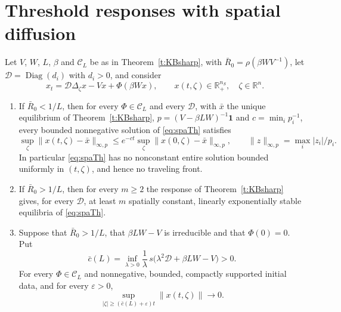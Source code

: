 \section{Threshold responses with spatial diffusion}\label{s:spaTh}
Let $V$, $W$, $L$, $\beta$ and $\mathcal C_L$ be as in Theorem~\ref{t:KBsharp}, with $\bar R_0=\rho(\beta WV^{-1})$, let $\mathcal D=\operatorname{Diag}(d_i)$ with $d_i>0$, and consider
\begin{equation}\label{eq:spaTh}
 x_t=\mathcal D\Delta_\zeta x-Vx+\Phi(\beta Wx),\qquad x(t,\zeta)\in\mathbb R_+^{n_S},\quad\zeta\in\mathbb R^n.
\end{equation}
\begin{enumerate}
\item If $\bar R_0<1/L$, then for every $\Phi\in\mathcal C_L$ and every $\mathcal D$, with $\bar x$ the unique equilibrium of
Theorem~\ref{t:KBsharp}, $p=(V-\beta LW)^{-1}\mathbf1$ and $c=\min_ip_i^{-1}$, every bounded nonnegative solution of \eqref{eq:spaTh} satisfies
\[
 \sup_\zeta\|x(t,\zeta)-\bar x\|_{\infty,p}\le e^{-ct}\sup_\zeta\|x(0,\zeta)-\bar x\|_{\infty,p},\qquad \|z\|_{\infty,p}=\max_i|z_i|/p_i.
\]
In particular \eqref{eq:spaTh} has no nonconstant entire solution bounded uniformly in $(t,\zeta)$, and hence no traveling front.
\item If $\bar R_0>1/L$, then for every $m\ge2$ the response of Theorem~\ref{t:KBsharp} gives, for every $\mathcal D$, at least $m$ spatially
constant, linearly exponentially stable equilibria of \eqref{eq:spaTh}.
\item Suppose that $\bar R_0>1/L$, that $\beta LW-V$ is irreducible and that $\Phi(0)=0$. Put
\[
 \bar c(L)=\inf_{\lambda>0}\frac1\lambda\,s\bigl(\lambda^2\mathcal D+\beta LW-V\bigr)>0.
\]
For every $\Phi\in\mathcal C_L$ and nonnegative, bounded, compactly supported initial data, and for every $\varepsilon>0$,
\[
 \sup_{|\zeta|\ge(\bar c(L)+\varepsilon)t}\|x(t,\zeta)\|\to0.
\]
\end{enumerate}
\eeT
